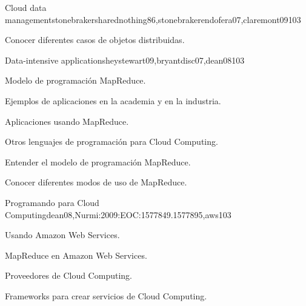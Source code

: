 \begin{syllabus}
\begin{unit}{Cloud data management}{stonebrakersharednothing86,stonebrakerendofera07,claremont09}{10}{3}
    \begin{unitgoals}
      \item \IMInformationModelsObjTWO%
      \item \IMInformationModelsObjSEVEN%
      \item \IMInformationModelsObjEIGHT%
      \item \IMInformationModelsObjNINE%
      \item \IMDistributedDatabasesObjTWO%
      \item Conocer diferentes casos de objetos distribuidas.
   \end{unitgoals}
\end{unit}


\begin{unit}{Data-intensive applications}{heystewart09,bryantdisc07,dean08}{10}{3}
    \begin{topics}
      \item Modelo de programación MapReduce.
      \item Ejemplos de aplicaciones en la academia y en la industria.
      \item Aplicaciones usando MapReduce.
      \item Otros lenguajes de programación para Cloud Computing.
   \end{topics}

   \begin{unitgoals}
      \item Entender el modelo de programación MapReduce.
      \item Conocer diferentes modos de uso de MapReduce. 
      \item \IMInformationModelsObjEIGHT%
      \item \IMInformationModelsObjNINE%
      \item \IMDistributedDatabasesObjTWO%
   \end{unitgoals}
\end{unit}


\begin{unit}{Programando para Cloud Computing}{dean08,Nurmi:2009:EOC:1577849.1577895,aws}{10}{3}
   \begin{topics}
      \item Usando Amazon Web Services.
      \item MapReduce en Amazon Web Services.
      \item Proveedores de Cloud Computing.
      \item Frameworks para crear servicios de Cloud Computing.
   \end{topics}


\end{unit}
\end{syllabus}
